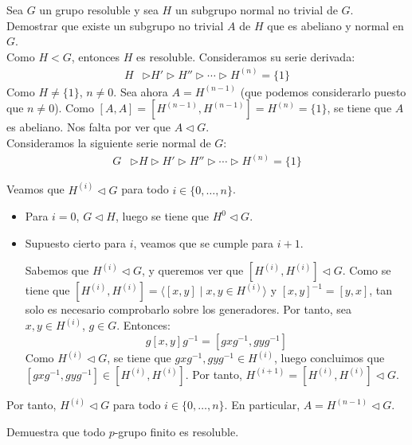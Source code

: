 \begin{ejercicio}
    Sea $G$ un grupo resoluble y sea $H$ un subgrupo normal no trivial de $G$. Demostrar que existe un subgrupo no trivial $A$ de $H$ que es abeliano y normal en $G$.\\

    Como $H<G$, entonces $H$ es resoluble. Consideramos su serie derivada:
    \begin{align*}
        H &\rhd H' \rhd H'' \rhd \cdots \rhd H^{(n)} = \{1\}
    \end{align*}
    Como $H\neq \{1\}$, $n\neq 0$. Sea ahora $A=H^{(n-1)}$ (que podemos considerarlo puesto que $n\neq 0$). Como $[A,A]=[H^{(n-1)},H^{(n-1)}]=H^{(n)}=\{1\}$, se tiene que $A$ es abeliano. Nos falta por ver que $A\lhd G$.\\


    Consideramos la siguiente serie normal de $G$:
    \begin{align*}
        G &\rhd H\rhd H' \rhd H'' \rhd \cdots \rhd H^{(n)} = \{1\}
    \end{align*}
    
    Veamos que $H^{(i)}\lhd G$ para todo $i\in\{0,\ldots,n\}$.
    \begin{itemize}
        \item Para $i=0$, $G\lhd H$, luego se tiene que $H^0\lhd G$.
        \item Supuesto cierto para $i$, veamos que se cumple para $i+1$.
        
        Sabemos que $H^{(i)}\lhd G$, y queremos ver que $[H^{(i)},H^{(i)}]\lhd G$. Como se tiene que $[H^{(i)},H^{(i)}]=\langle [x,y] \mid x,y\in H^{(i)}\rangle$ y $[x,y]^{-1}=[y,x]$, tan solo es necesario comprobarlo sobre los generadores. Por tanto, sea $x,y\in H^{(i)}$, $g\in G$. Entonces:
        \begin{equation*}
            g[x,y]g^{-1} = [gxg^{-1},gyg^{-1}]
        \end{equation*}
        Como $H^{(i)}\lhd G$, se tiene que $gxg^{-1},gyg^{-1}\in H^{(i)}$, luego concluimos que $[gxg^{-1},gyg^{-1}]\in [H^{(i)},H^{(i)}]$. Por tanto, $H^{(i+1)}= [H^{(i)},H^{(i)}]\lhd G$.
    \end{itemize}

    Por tanto, $H^{(i)}\lhd G$ para todo $i\in\{0,\ldots,n\}$. En particular, $A=H^{(n-1)}\lhd G$.
\end{ejercicio}

\begin{ejercicio}
    Demuestra que todo $p$-grupo finito es resoluble.


\end{ejercicio}

